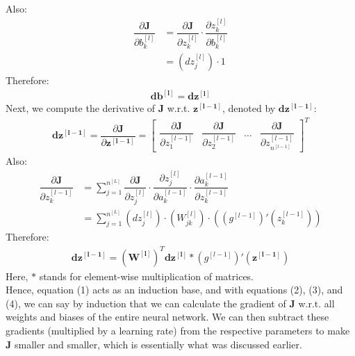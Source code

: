 \documentclass[a4paper, 12pt]{report}
\begin{document}
Also:
\begin{align*}
\dfrac{\partial \bm{J}}{\partial b_k^{\left[l\right]}} &= \dfrac{\partial \bm{J}}{\partial z_k^{\left[l\right]}}\cdot\dfrac{\partial z_k^{\left[l\right]}}{\partial b_k^{\left[l\right]}} \\
&= \left(dz_{j}^{\left[l\right]}\right)\cdot 1
\end{align*}
Therefore:
\begin{align}
\bm{db^{\left[l\right]}} = \bm{dz^{\left[l\right]}}
\end{align}
Next, we compute the derivative of $\bm{J}$ w.r.t. $\bm{z^{\left[l-1\right]}}$, denoted by $\bm{dz^{\left[l-1\right]}}$:
\begin{align*}
\bm{dz^{\left[l-1\right]}} = \dfrac{\partial \bm{J}}{\partial \bm{z^{\left[l-1\right]}}} = 
\begin{bmatrix}
\dfrac{\partial \bm{J}}{\partial z_{1}^{\left[l-1\right]}} &
\dfrac{\partial \bm{J}}{\partial z_{2}^{\left[l-1\right]}} &
\dots &
\dfrac{\partial \bm{J}}{\partial z_{n^{[l-1]}}^{\left[l-1\right]}}
\end{bmatrix}^T
\end{align*}
Also:
\begin{align*}
\dfrac{\partial \bm{J}}{\partial z_k^{\left[l-1\right]}} &= \sum_{j=1}^{n^{[L]}}\dfrac{\partial \bm{J}}{\partial z_j^{\left[l\right]}}\cdot\dfrac{\partial z_j^{\left[l\right]}}{\partial a_k^{\left[l-1\right]}}\cdot\dfrac{\partial a_k^{\left[l-1\right]}}{\partial z_k^{\left[l-1\right]}} \\
&= \sum_{j=1}^{n^{[L]}}\left(dz_{j}^{\left[l\right]}\right)\cdot\left(W_{jk}^{\left[l\right]}\right)\cdot\left(\left(g^{[l-1]}\right)'\left(z_k^{\left[l-1\right]}\right)\right)
\end{align*}
Therefore:
\begin{align}
\bm{dz^{\left[l-1\right]}} = \left(\bm{W^{\left[l\right]}}\right)^T\bm{dz^{\left[l\right]}} * \left(g^{[l-1]}\right)'\left(\bm{z^{\left[l-1\right]}}\right)
\end{align}
Here, $*$ stands for element-wise multiplication of matrices. \\
Hence, equation (1) acts as an induction base, and with equations (2), (3), and (4), we can say by induction that we can calculate the gradient of $\bm{J}$ w.r.t. all weights and biases of the entire neural network. We can then subtract these gradients (multiplied by a learning rate) from the respective parameters to make $\bm{J}$ smaller and smaller, which is essentially what was discussed earlier.
\end{document}

